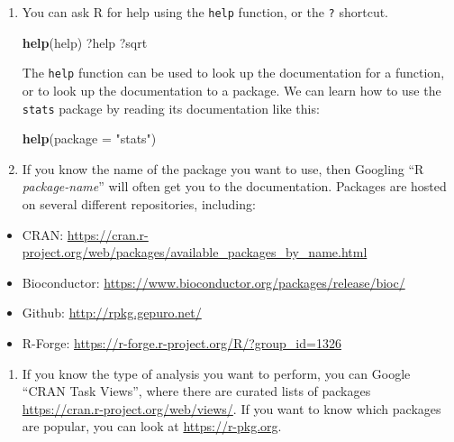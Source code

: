 \documentclass[]{book}
\newenvironment{Shaded}{\begin{snugshade}}{\end{snugshade}}
\newcommand{\DataTypeTok}[1]{\textcolor[rgb]{0.13,0.29,0.53}{#1}}
\newcommand{\KeywordTok}[1]{\textcolor[rgb]{0.13,0.29,0.53}{\textbf{#1}}}
\newcommand{\NormalTok}[1]{#1}
\newcommand{\StringTok}[1]{\textcolor[rgb]{0.31,0.60,0.02}{#1}}
\providecommand{\tightlist}{%
  \setlength{\itemsep}{0pt}\setlength{\parskip}{0pt}}
\begin{document}
\begin{enumerate}
\def\labelenumi{\arabic{enumi}.}
\item
  You can ask R for help using the \texttt{help} function, or the \texttt{?} shortcut.

\begin{Shaded}
\begin{Highlighting}[]
\KeywordTok{help}\NormalTok{(help)}
\NormalTok{?help}
\NormalTok{?sqrt}
\end{Highlighting}
\end{Shaded}

  The \texttt{help} function can be used to look up the documentation for a function, or
  to look up the documentation to a package. We can learn how to use the \texttt{stats}
  package by reading its documentation like this:

\begin{Shaded}
\begin{Highlighting}[]
   \KeywordTok{help}\NormalTok{(}\DataTypeTok{package =} \StringTok{"stats"}\NormalTok{)}
\end{Highlighting}
\end{Shaded}
\item
  If you know the name of the package you want to use, then Googling ``R \emph{package-name}'' will
  often get you to the documentation. Packages are hosted on several different repositories, including:
\end{enumerate}

\begin{itemize}
\tightlist
\item
  CRAN: \url{https://cran.r-project.org/web/packages/available_packages_by_name.html}
\item
  Bioconductor: \url{https://www.bioconductor.org/packages/release/bioc/}
\item
  Github: \url{http://rpkg.gepuro.net/}
\item
  R-Forge: \url{https://r-forge.r-project.org/R/?group_id=1326}
\end{itemize}

\begin{enumerate}
\def\labelenumi{\arabic{enumi}.}
\setcounter{enumi}{2}
\tightlist
\item
  If you know the type of analysis you want to perform, you can Google ``CRAN Task Views'',
  where there are curated lists of packages \url{https://cran.r-project.org/web/views/}. If you want to
  know which packages are popular, you can look at \url{https://r-pkg.org}.
\end{enumerate}
\end{document}
